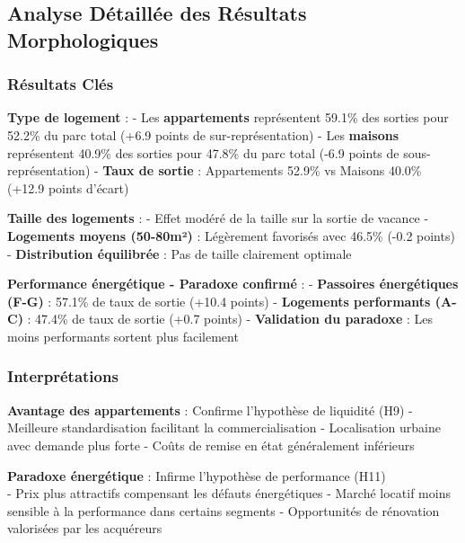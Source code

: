 \documentclass[11pt]{article}
\begin{document}
    \subsection{Analyse Détaillée des Résultats
Morphologiques}\label{analyse-duxe9tailluxe9e-des-ruxe9sultats-morphologiques}

\subsubsection{Résultats Clés}\label{ruxe9sultats-cluxe9s}

\textbf{Type de logement} : - Les \textbf{appartements} représentent
59.1\% des sorties pour 52.2\% du parc total (+6.9 points de
sur-représentation) - Les \textbf{maisons} représentent 40.9\% des
sorties pour 47.8\% du parc total (-6.9 points de sous-représentation) -
\textbf{Taux de sortie} : Appartements 52.9\% vs Maisons 40.0\% (+12.9
points d'écart)

\textbf{Taille des logements} : - Effet modéré de la taille sur la
sortie de vacance - \textbf{Logements moyens (50-80m²)} : Légèrement
favorisés avec 46.5\% (-0.2 points) - \textbf{Distribution équilibrée} :
Pas de taille clairement optimale

\textbf{Performance énergétique - Paradoxe confirmé} : -
\textbf{Passoires énergétiques (F-G)} : 57.1\% de taux de sortie (+10.4
points) - \textbf{Logements performants (A-C)} : 47.4\% de taux de
sortie (+0.7 points) - \textbf{Validation du paradoxe} : Les moins
performants sortent plus facilement

\subsubsection{Interprétations}\label{interpruxe9tations}

\textbf{Avantage des appartements} : Confirme l'hypothèse de liquidité
(H9) - Meilleure standardisation facilitant la commercialisation -
Localisation urbaine avec demande plus forte - Coûts de remise en état
généralement inférieurs

\textbf{Paradoxe énergétique} : Infirme l'hypothèse de performance
(H11)\\
- Prix plus attractifs compensant les défauts énergétiques - Marché
locatif moins sensible à la performance dans certains segments -
Opportunités de rénovation valorisées par les acquéreurs
\end{document}

